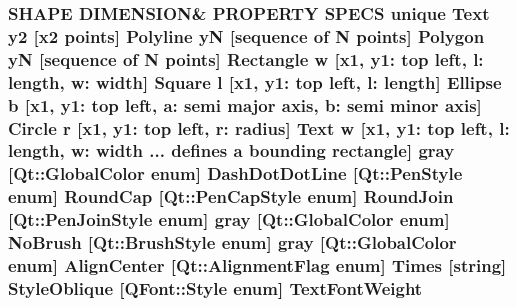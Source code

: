 \subsubsection[{\texorpdfstring{Text\+Font\+Weight}{TextFontWeight}}]{\setlength{\rightskip}{0pt plus 5cm}S\+H\+A\+PE D\+I\+M\+E\+N\+S\+I\+ON\& P\+R\+O\+P\+E\+R\+TY S\+P\+E\+CS unique {\bf Text} {\bf y2} \mbox{[}{\bf x2} points\mbox{]} {\bf Polyline} yN \mbox{[}sequence of N points\mbox{]} {\bf Polygon} yN \mbox{[}sequence of N points\mbox{]} {\bf Rectangle} w \mbox{[}{\bf x1}, y1\+: top left, l\+: length, w\+: width\mbox{]} {\bf Square} {\bf l} \mbox{[}{\bf x1}, y1\+: top left, l\+: length\mbox{]} {\bf Ellipse} b \mbox{[}{\bf x1}, y1\+: top left, a\+: semi major axis, b\+: semi minor axis\mbox{]} {\bf Circle} r \mbox{[}{\bf x1}, y1\+: top left, r\+: radius\mbox{]} {\bf Text} w \mbox{[}{\bf x1}, y1\+: top left, l\+: length, w\+: width ... defines {\bf a} bounding rectangle\mbox{]} gray \mbox{[}Qt\+::\+Global\+Color enum\mbox{]} Dash\+Dot\+Dot\+Line \mbox{[}Qt\+::\+Pen\+Style enum\mbox{]} Round\+Cap \mbox{[}{\bf Qt\+::\+Pen\+Cap\+Style} enum\mbox{]} Round\+Join \mbox{[}{\bf Qt\+::\+Pen\+Join\+Style} enum\mbox{]} gray \mbox{[}Qt\+::\+Global\+Color enum\mbox{]} No\+Brush \mbox{[}{\bf Qt\+::\+Brush\+Style} enum\mbox{]} gray \mbox{[}Qt\+::\+Global\+Color enum\mbox{]} Align\+Center \mbox{[}Qt\+::\+Alignment\+Flag enum\mbox{]} Times \mbox{[}string\mbox{]} Style\+Oblique \mbox{[}Q\+Font\+::\+Style enum\mbox{]} Text\+Font\+Weight}\hypertarget{shape__input__file__specs_8txt_af288033940c4625f54a91877603a16a2}{}\label{shape__input__file__specs_8txt_af288033940c4625f54a91877603a16a2}
